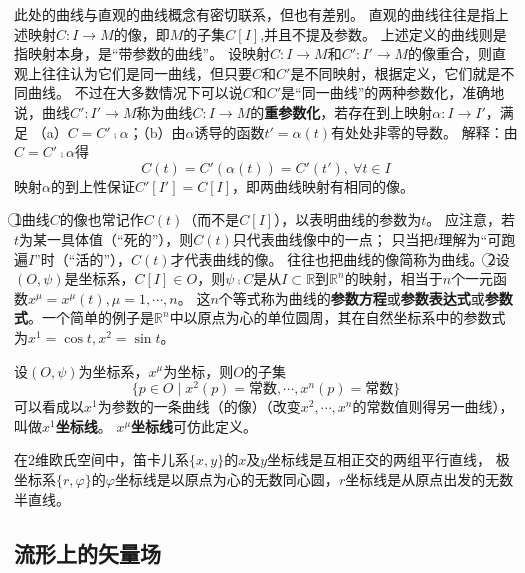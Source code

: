 \begin{note}
此处的曲线与直观的曲线概念有密切联系，但也有差别。
直观的曲线往往是指上述映射$C \colon I \to M$的像，即$M$的子集$C[I]$,并且不提及参数。
上述定义的曲线则是指映射本身，是``带参数的曲线''。
设映射$C \colon I \to M$和$C' \colon I' \to M$的像重合，则直观上往往认为它们是同一曲线，但只要$C$和$C'$是不同映射，根据定义，它们就是不同曲线。
不过在大多数情况下可以说$C$和$C'$是``同一曲线''的两种参数化，准确地说，曲线$C' \colon I' \to M$称为曲线$C \colon I \to M$的\textbf{重参数化}，若存在到上映射$\alpha \colon I \to I'$，满足
（a）$C = C' \comp \alpha$；（b）由$\alpha$诱导的函数$t' = \alpha(t)$有处处非零的导数。
解释：由$C = C' \comp \alpha$得$$C(t) = C'(\alpha(t)) = C'(t'), ~ \forall t \in I$$
映射$\alpha$的到上性保证$C'[I'] = C[I]$，即两曲线映射有相同的像。
\end{note}

\begin{note}
\textcircled{1}曲线$C$的像也常记作$C(t)$（而不是$C[I]$），以表明曲线的参数为$t$。
应注意，若$t$为某一具体值（``死的''），则$C(t)$只代表曲线像中的一点；
只当把$t$理解为``可跑遍$I$''时（``活的''），$C(t)$才代表曲线的像。
往往也把曲线的像简称为曲线。
\textcircled{2}设$(O, \psi)$是坐标系，$C[I] \in O$，则$\psi \comp C$是从$I \subset \mathbb{R}$到$\mathbb{R}^n$的映射，相当于$n$个一元函数$x^\mu = x^\mu(t), \mu = 1, \cdots, n$。
这$n$个等式称为曲线的\textbf{参数方程}或\textbf{参数表达式}或\textbf{参数式}。一个简单的例子是$\mathbb{R}^n$中以原点为心的单位圆周，其在自然坐标系中的参数式为$x^1 = \cos t, x^2 = \sin t$。
\end{note}

\begin{definition}
设$(O, \psi)$为坐标系，$x^\mu$为坐标，则$O$的子集
$$\{p \in O \mid x^2(p) = \text{常数}, \cdots, x^n(p) = \text{常数}\}$$
可以看成以$x^1$为参数的一条曲线（的像）（改变$x^2, \cdots, x^n$的常数值则得另一曲线），叫做\textbf{$x^1$坐标线}。
\textbf{$x^\mu$坐标线}可仿此定义。
\end{definition}

\begin{example}
在$2$维欧氏空间中，笛卡儿系$\{x, y\}$的$x$及$y$坐标线是互相正交的两组平行直线，
极坐标系$\{r, \varphi\}$的$\varphi$坐标线是以原点为心的无数同心圆，$r$坐标线是从原点出发的无数半直线。
\end{example}

\subsection{流形上的矢量场}
